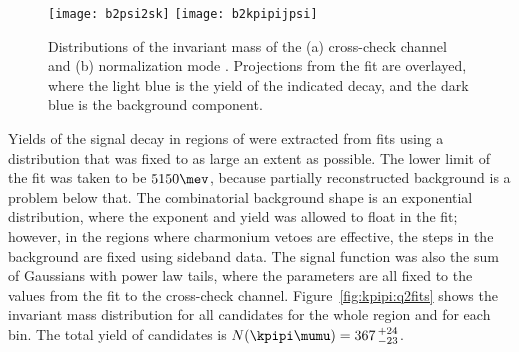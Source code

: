 \begin{figure}
  \begin{center}
    \texttt{[image: b2psi2sk]}
    \texttt{[image: b2kpipijpsi]}
    \caption[Fits to \btojpsikpipi and \btopsitwosk candidates]
    {\small
      Distributions of the invariant mass of the
      (a) cross-check channel \btojpsikpipi and
      (b) normalization mode \btopsitwosk.
      Projections from the fit are overlayed, where the light blue is the yield of the indicated
      decay, and the dark blue is the background component.
    }
    \label{fig:kpipi:norm}
  \end{center}
\end{figure}



Yields of the signal decay in regions of \qsq were extracted from fits using a distribution that
was fixed to as large an extent as possible.
The lower limit of the fit was taken to be $5150\mev$, because partially reconstructed background
is a problem below that.
The combinatorial background shape is an exponential distribution, where the exponent and yield was
allowed to float in the fit; however, in the regions where charmonium vetoes are effective, the
steps in the background are fixed using sideband data.
The signal function was also the sum of Gaussians with power law tails, where the parameters are
all fixed to the values from the fit to the cross-check channel.
Figure~\ref{fig:kpipi:q2fits} shows the invariant mass distribution for all \btokpipimumu
candidates for the whole \qsq region and for each bin.
The total yield of \btokpipimumu candidates is $N(\kpipi\mumu)=367\,^{+24}_{-23}$.

